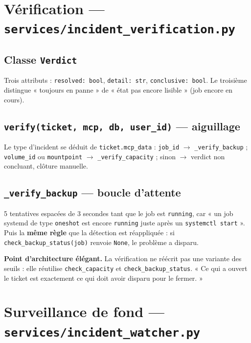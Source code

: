 \documentclass[11pt,a4paper]{report}
\newcommand{\file}[1]{\texttt{\small #1}}
\newcommand{\fn}[1]{\texttt{\small\textcolor{oasisviolet}{#1}}}
\newcommand{\cls}[1]{\texttt{\small\textcolor{oasisblue}{#1}}}
\newcommand{\arrowto}{\ensuremath{\rightarrow}}
\begin{document}
\section{Vérification --- \file{services/incident\_verification.py}}

\subsection*{Classe \cls{Verdict}}
Trois attributs : \texttt{resolved: bool}, \texttt{detail: str},
\texttt{conclusive: bool}. Le troisième distingue « toujours en panne » de
« état pas encore lisible » (job encore en cours).

\subsection*{\fn{verify(ticket, mcp, db, user\_id)} --- aiguillage}
Le type d'incident se déduit de \texttt{ticket.mcp\_data} :
\texttt{job\_id} \arrowto{} \fn{\_verify\_backup} ;
\texttt{volume\_id} ou \texttt{mountpoint} \arrowto{} \fn{\_verify\_capacity} ;
sinon \arrowto{} verdict non concluant, clôture manuelle.

\subsection*{\fn{\_verify\_backup} --- boucle d'attente}
5 tentatives espacées de 3 secondes tant que le job est \texttt{running}, car
« un job systemd de type \texttt{oneshot} est encore \texttt{running} juste
après un \texttt{systemctl start} ». Puis la \textbf{même règle} que la
détection est réappliquée : si \fn{check\_backup\_status(job)} renvoie
\texttt{None}, le problème a disparu.

\begin{keybox}
\textbf{Point d'architecture élégant.} La vérification ne réécrit pas une
variante des seuils : elle réutilise \fn{check\_capacity} et
\fn{check\_backup\_status}. « Ce qui a ouvert le ticket est exactement ce qui
doit avoir disparu pour le fermer. »
\end{keybox}

\section{Surveillance de fond --- \file{services/incident\_watcher.py}}
\end{document}
